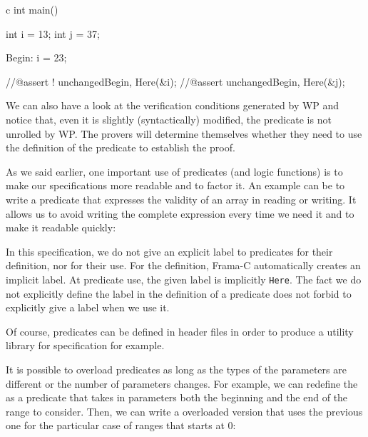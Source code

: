 \begin{CodeBlock}{c}
int main(){
  int i = 13;
  int j = 37;

 Begin:
  i = 23;
 
  //@assert ! unchanged{Begin, Here}(&i);
  //@assert   unchanged{Begin, Here}(&j);
}
\end{CodeBlock}



We can also have a look at the verification conditions generated by WP and
notice that, even it is slightly (syntactically) modified, the predicate is not
unrolled by WP. The provers will determine themselves whether they need to use
the definition of the predicate to establish the proof.

As we said earlier, one important use of predicates (and logic
functions) is to make our specifications more readable and to factor it.
An example can be to write a predicate that expresses the validity of an
array in reading or writing. It allows us to avoid writing the complete
expression every time we need it and to make it readable quickly:






In this specification, we do not give an explicit label to predicates
for their definition, nor for their use. For the definition, Frama-C
automatically creates an implicit label. At predicate use, the given
label is implicitly \texttt{Here}. The fact we do not explicitly define
the label in the definition of a predicate does not forbid to explicitly
give a label when we use it.

Of course, predicates can be defined in header files in order to produce
a utility library for specification for example.






It is possible to overload predicates as long as the types of the
parameters are different or the number of parameters changes. For
example, we can redefine the  as a
predicate that takes in parameters both the beginning and the end
of the range to consider. Then, we can write a overloaded version that
uses the previous one for the particular case of ranges that starts
at 0:







